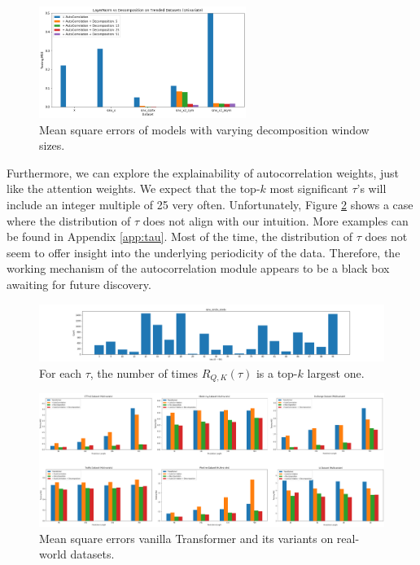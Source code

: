 \begin{figure}
    \centering
    \includegraphics[width=0.6\textwidth]{img/mse_trended_decomp.png}
    \caption{Mean square errors of models with varying decomposition window sizes.}
    \label{fig:lwin}
\end{figure}

Furthermore, we can explore the explainability of autocorrelation weights, just like the attention weights. 
We expect that the top-$k$ most significant $\tau$'s will include an integer multiple of 25 very often. 
Unfortunately, Figure \ref{fig:tau_synth} shows a case where the distribution of $\tau$ does not align with our intuition. 
More examples can be found in Appendix \ref{app:tau}. 
Most of the time, the distribution of $\tau$ does not seem to offer insight into the underlying periodicity of the data. 
Therefore, the working mechanism of the autocorrelation module appears to be a black box awaiting for future discovery. 

\begin{figure}
    \centering
    \includegraphics[width=\textwidth]{img/tau_sinx_sin2x_sin4x.png}
    \caption{For each $\tau$, the number of times $R_{Q, K}(\tau)$ is a top-$k$ largest one.}
    \label{fig:tau_synth}
\end{figure}

\begin{figure}
    \centering
    \includegraphics[width=\textwidth]{img/mse_real.png}
    \caption{Mean square errors vanilla Transformer and its variants on real-world datasets.}
    \label{fig:mse_real}
\end{figure}

